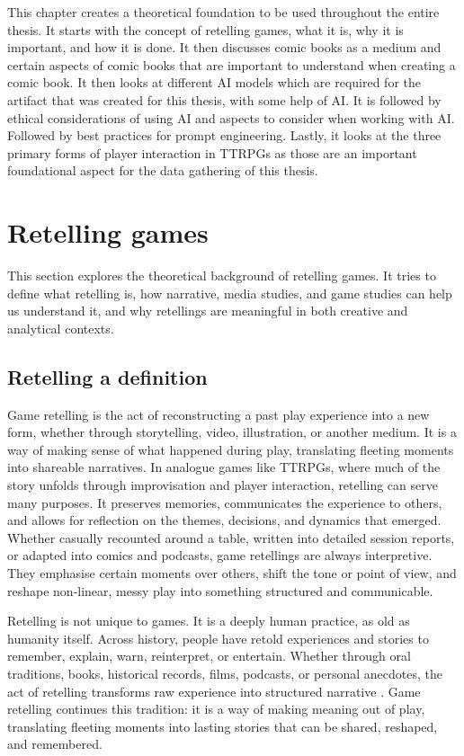 This chapter creates a theoretical foundation to be used throughout the entire thesis. It starts with the concept of retelling games, what it is, why it is important, and how it is done. It then discusses comic books as a medium and certain aspects of comic books that are important to understand when creating a comic book. It then looks at different AI models which are required for the artifact that was created for this thesis, with some help of AI. It is followed by ethical considerations of using AI and aspects to consider when working with AI. Followed by best practices for prompt engineering. Lastly, it looks at the three primary forms of player interaction in TTRPGs as those are an important foundational aspect for the data gathering of this thesis.

\section{Retelling games}
This section explores the theoretical background of retelling games. It tries to define what retelling is, how narrative, media studies, and game studies can help us understand it, and why retellings are meaningful in both creative and analytical contexts.

\subsection*{Retelling a definition}
Game retelling is the act of reconstructing a past play experience into a new form, whether through storytelling, video, illustration, or another medium. It is a way of making sense of what happened during play, translating fleeting moments into shareable narratives. In analogue games like TTRPGs, where much of the story unfolds through improvisation and player interaction, retelling can serve many purposes. It preserves memories, communicates the experience to others, and allows for reflection on the themes, decisions, and dynamics that emerged. Whether casually recounted around a table, written into detailed session reports, or adapted into comics and podcasts, game retellings are always interpretive. They emphasise certain moments over others, shift the tone or point of view, and reshape non-linear, messy play into something structured and communicable.

Retelling is not unique to games. It is a deeply human practice, as old as humanity itself. Across history, people have retold experiences and stories to remember, explain, warn, reinterpret, or entertain. Whether through oral traditions, books, historical records, films, podcasts, or personal anecdotes, the act of retelling transforms raw experience into structured narrative \cite{storr2019science}. Game retelling continues this tradition: it is a way of making meaning out of play, translating fleeting moments into lasting stories that can be shared, reshaped, and remembered.

